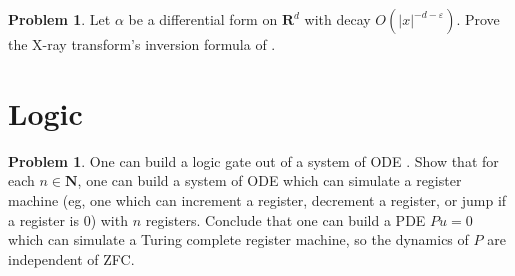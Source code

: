 \documentclass[reqno,11pt]{amsart}
\newcommand{\NN}{\mathbf{N}}
\newcommand{\RR}{\mathbf{R}}
\theoremstyle{definition}
\newtheorem{problem}[theorem]{Problem}
\numberwithin{equation}{section}
\begin{document}
\begin{problem}
Let $\alpha$ be a differential form on $\RR^d$ with decay $O(|x|^{-d-\varepsilon})$.
Prove the X-ray transform's inversion formula of \cite{Solomon11}.
\end{problem}


\section{Logic}
\begin{problem}
One can build a logic gate out of a system of ODE \cite{Tao16}.
Show that for each $n \in \NN$, one can build a system of ODE which can simulate a register machine (eg, one which can increment a register, decrement a register, or jump if a register is $0$) with $n$ registers.
Conclude that one can build a PDE $Pu = 0$ which can simulate a Turing complete register machine, so the dynamics of $P$ are independent of ZFC.
\end{problem}



\printbibliography
\end{document}
